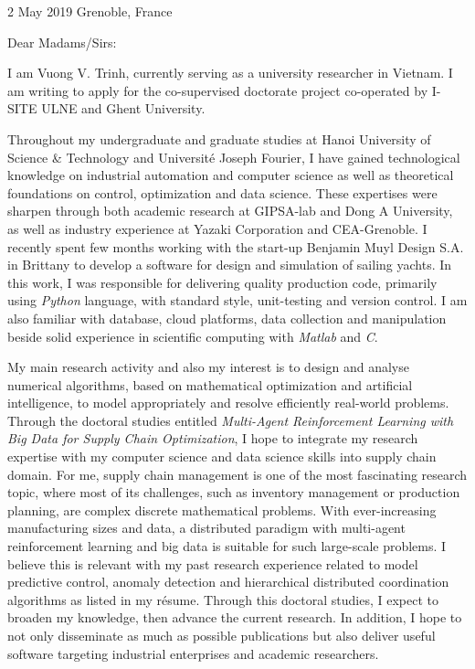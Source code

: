 \documentclass[a4paper,11pt]{article}
\begin{document}
{\hspace*{-\marginparsep minus \marginparwidth}
\begin{minipage}[t]{\textwidth+\marginparwidth+\marginparsep}
	
2 May 2019 \hfill{Grenoble, France}

\vspace{0.75cm}

Dear Madams/Sirs:

\vspace{0.3cm}

I am Vuong V. Trinh, currently serving as a university researcher in Vietnam. I am writing to apply for the co-supervised doctorate project co-operated by I-SITE ULNE and Ghent University. 

\vspace{0.3cm}

Throughout my undergraduate and graduate studies at Hanoi University of Science \& Technology and Universit\'{e} Joseph Fourier, I have gained technological knowledge on industrial automation and computer science as well as theoretical foundations on control, optimization and data science. These expertises were sharpen through both academic research at GIPSA-lab and Dong A University, as well as industry experience at Yazaki Corporation and CEA-Grenoble. I recently spent few months working with the start-up Benjamin Muyl Design S.A. in Brittany to develop a software for design and simulation of sailing yachts. In this work, I was responsible for delivering quality production code, primarily using \emph{Python} language, with standard style, unit-testing and version control. I am also familiar with database, cloud platforms, data collection and manipulation beside solid experience in scientific computing with \emph{Matlab} and \emph{C}. 

\vspace{0.3cm}

My main research activity and also my interest is to design and analyse numerical algorithms, based on mathematical optimization and artificial intelligence, to model appropriately and resolve efficiently real-world problems. Through the doctoral studies entitled \emph{Multi-Agent Reinforcement Learning with Big Data for Supply Chain Optimization}, I hope to integrate my research expertise with my computer science and data science skills into supply chain domain. For me, supply chain management is one of the most fascinating research topic, where most of its challenges, such as inventory management or production planning, are complex discrete mathematical problems. With ever-increasing manufacturing sizes and data, a distributed paradigm with multi-agent reinforcement learning and big data is suitable for such large-scale problems. I believe this is relevant with my past research experience related to model predictive control, anomaly detection and hierarchical distributed coordination algorithms as listed in my r\'{e}sume. Through this doctoral studies, I expect to broaden my knowledge, then advance the current research. In addition, I hope to not only disseminate as much as possible publications but also deliver useful software targeting industrial enterprises and academic researchers.


\end{minipage}}
\end{document}
